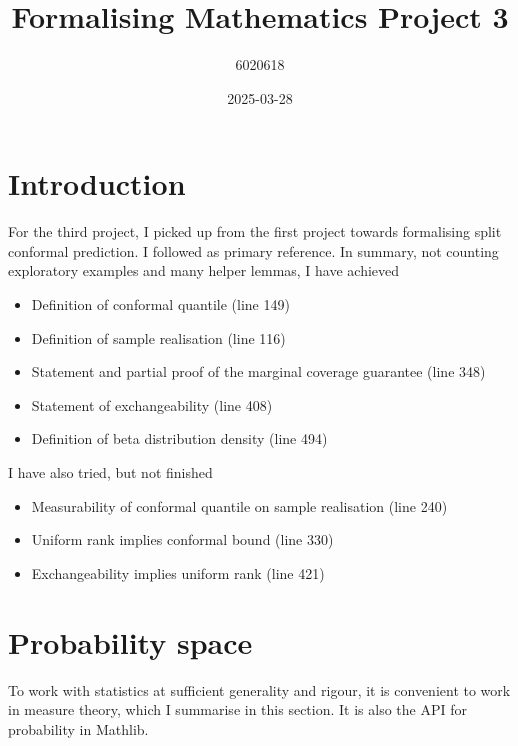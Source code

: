 \documentclass[a4paper, 12pt]{article}
\begin{document}
\title{Formalising Mathematics Project 3}
\author{6020618}
\date{2025-03-28}
\maketitle




\section*{Introduction}

For the third project,
I picked up from the first project
towards formalising split conformal prediction.
I followed \cite{tibshirani_stat_2023} as primary reference.
In summary, not counting exploratory examples and many helper lemmas, I have achieved

\vspace{10pt}
\begin{itemize}
  \item Definition of conformal quantile (line 149)
  \item Definition of sample realisation (line 116)
  \item Statement and partial proof of the marginal coverage guarantee (line 348)
  \item Statement of exchangeability (line 408)
  \item Definition of beta distribution density (line 494)
\end{itemize}
\vspace{10pt}

I have also tried, but not finished

\vspace{10pt}
\begin{itemize}
  \item Measurability of conformal quantile on sample realisation (line 240)
  \item Uniform rank implies conformal bound (line 330)
  \item Exchangeability implies uniform rank (line 421)
\end{itemize}





\section*{Probability space}

To work with statistics at sufficient generality and rigour,
it is convenient to work in measure theory, which I summarise in this section.
It is also the API for probability in Mathlib.
\end{document}
